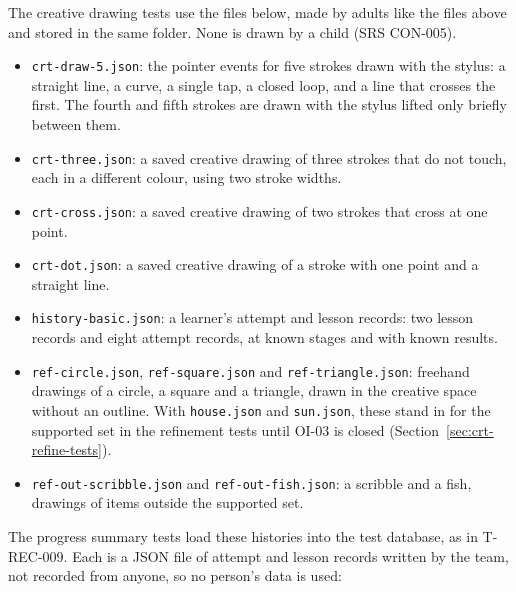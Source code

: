 \documentclass[12pt, titlepage]{article}
\begin{document}
The creative drawing tests use the files below, made by adults like the
files above and stored in the same folder. None is drawn by a child (SRS
CON-005).
\begin{itemize}
\item \texttt{crt-draw-5.json}: the pointer events for five strokes drawn
with the stylus: a straight line, a curve, a single tap, a closed loop, and a
line that crosses the first. The fourth and fifth strokes are drawn with the
stylus lifted only briefly between them.
\item \texttt{crt-three.json}: a saved creative drawing of three strokes that
do not touch, each in a different colour, using two stroke widths.
\item \texttt{crt-cross.json}: a saved creative drawing of two strokes that
cross at one point.
\item \texttt{crt-dot.json}: a saved creative drawing of a stroke with one
point and a straight line.
\item \texttt{history-basic.json}: a learner's attempt and lesson records:
two lesson records and eight attempt records, at known stages and with known
results.
\item \texttt{ref-\allowbreak{}circle.json},
\texttt{ref-\allowbreak{}square.json} and
\texttt{ref-\allowbreak{}triangle.json}: freehand drawings of a circle, a
square and a triangle, drawn in the creative space without an outline. With
\texttt{house.json} and \texttt{sun.json}, these stand in for the supported
set in the refinement tests until OI-03 is closed
(Section~\ref{sec:crt-refine-tests}).
\item \texttt{ref-\allowbreak{}out-\allowbreak{}scribble.json} and
\texttt{ref-\allowbreak{}out-\allowbreak{}fish.json}: a scribble and a fish,
drawings of items outside the supported set.
\end{itemize}
The progress summary tests load these histories into the test database, as
in T-REC-009. Each is a JSON file of attempt and lesson records written by
the team, not recorded from anyone, so no person's data is used:
\end{document}
